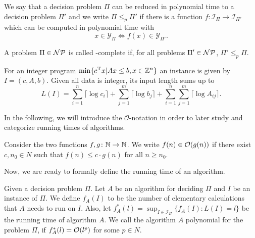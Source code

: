 \begin{definition}
	We say that a decision problem $\Pi$ can be reduced in polynomial time to a decision problem $\Pi'$ and we write $\Pi \leq_p \Pi'$ if there is a function $f \colon \mathcal{I}_{\Pi} \to \mathcal{I}_{\Pi'}$ which can be computed in polynomial time with
	$$x \in \mathcal{Y}_{\Pi} \iff f(x) \in \mathcal{Y}_{\Pi'}.$$
\end{definition}

\begin{definition}
	A problem $\Pi \in \mathcal{NP}$ is called \NP-complete if, for all problems $\Pi' \in \mathcal{NP}$, $\Pi' \leq_p \Pi$.
\end{definition}

For an integer program $\min\{c^\text{T} x | Ax \leq b, x \in \mathbb{Z}^n\}$ an instance is given by $I = (c, A, b)$. Given all data is integer, its input length sums up to 
$$L(I) = \sum_{i=1}^{n} \lceil \log c_i \rceil + \sum_{j=1}^{m} \lceil \log b_j \rceil + \sum_{i=1}^{n} \sum_{j=1}^{m} \lceil \log A_{ij} \rceil.$$

In the following, we will introduce the $\mathcal{O}$-notation in order to later study and categorize running times of algorithms.

\begin{definition}[$\OO$-Notation]
	\label{def:onotation}
	Consider the two functions $f, g \colon \mathbb{N} \to \mathbb{N}$. We write $f(n) \in \mathcal{O}(g(n))$ if there exist $c, n_0 \in N$ such that $f(n) \leq c \cdot g(n)$ for all $n \geq n_0$.
\end{definition}

Now, we are ready to formally define the running time of an algorithm.

\begin{definition}
	Given a decision problem $\Pi$. Let $A$ be an algorithm for deciding $\Pi$ and $I$ be an instance of $\Pi$. We define $f_A(I)$ to be the number of elementary calculations that $A$ needs to run on $I$. Also, let $f^*_A(l) = \sup_{I \in \mathcal{I}_{\Pi}}	\{f_A(I) \colon L(I) = l\}$ be the running time of algorithm $A$. We call the algorithm $A$ polynomial for the problem $\Pi$, if $f^*_A(l)=\mathcal{O}(l^p)$ for some $p \in N$.
\end{definition}